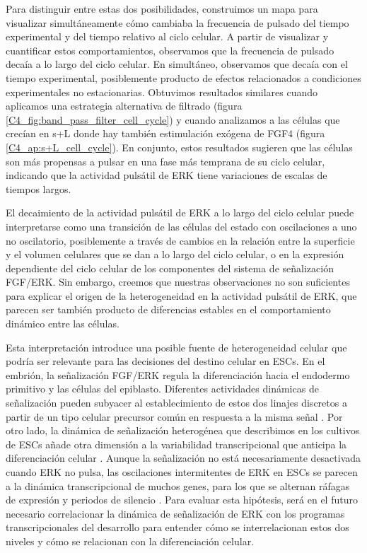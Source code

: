 \documentclass[./main.tex]{subfiles}
\begin{document}
Para distinguir entre estas dos posibilidades, construimos un mapa para visualizar simultáneamente cómo cambiaba la frecuencia de pulsado del tiempo experimental y del tiempo relativo al ciclo celular. A partir de visualizar y cuantificar estos comportamientos, observamos que la frecuencia de pulsado decaía a lo largo del ciclo celular. En simultáneo, observamos que decaía con el tiempo experimental, posiblemente producto de efectos relacionados a condiciones experimentales no estacionarias. Obtuvimos resultados similares cuando aplicamos una estrategia alternativa de filtrado (figura \ref{C4_fig:band_pass_filter_cell_cycle}) y cuando analizamos a las células que crecían en s+L donde hay también estimulación exógena de FGF4 (figura \ref{C4_ap:s+L_cell_cycle}). En conjunto, estos resultados sugieren que las células son más propensas a pulsar en una fase más temprana de su ciclo celular, indicando que la actividad pulsátil de ERK tiene variaciones de escalas de tiempos largos.


El decaimiento de la actividad pulsátil de ERK a lo largo del ciclo celular puede interpretarse como una transición de las células del estado con oscilaciones a uno no oscilatorio, posiblemente a través de cambios en la relación entre la superficie y el volumen celulares que se dan a lo largo del ciclo celular, o en la expresión dependiente del ciclo celular de los componentes del sistema de señalización FGF/ERK. Sin embargo, creemos que nuestras observaciones no son suficientes para explicar el origen de la heterogeneidad en la actividad pulsátil de ERK, que parecen ser también producto de diferencias estables en el comportamiento dinámico entre las células. 

Esta interpretación introduce una posible fuente de heterogeneidad celular que podría ser relevante para las decisiones del destino celular en ESCs. En el embrión, la señalización FGF/ERK regula la diferenciación hacia el endodermo primitivo y las células del epiblasto. Diferentes actividades dinámicas de señalización pueden subyacer al establecimiento de estos dos linajes discretos a partir de un tipo celular precursor común en respuesta a la misma señal \cite{Pokrass2020}. Por otro lado, la dinámica de señalización heterogénea que describimos en los cultivos de ESCs añade otra dimensión a la variabilidad transcripcional que anticipa la diferenciación celular \cite{Canham2010,Chambers2007,Hayashi2008,Singh2007,Toyooka2008}. Aunque la señalización no está necesariamente desactivada cuando ERK no pulsa, las oscilaciones intermitentes de ERK en ESCs se parecen a la dinámica transcripcional de muchos genes, para los que se alternan ráfagas de expresión y periodos de silencio \cite{Tunnacliffe2020}. Para evaluar esta hipótesis, será en el futuro necesario correlacionar la dinámica de señalización de ERK con los programas transcripcionales del desarrollo para entender cómo se interrelacionan estos dos niveles y cómo se relacionan con la diferenciación celular.

 
\end{document}
